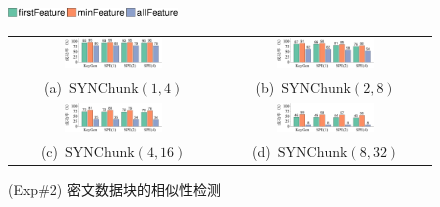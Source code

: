 \begin{figure}[!htb]
  \centering
  \includegraphics[width=0.4\textwidth]{pic/featurespy/plot/detection/syn/synBarPlotDetect_legend.pdf}\\
  \begin{tabular}{@{}c@{}c}
    \includegraphics[width=0.49\textwidth]{pic/featurespy/plot/detection/syn/syn-p1-q4-detect.pdf}  &
    \includegraphics[width=0.49\textwidth]{pic/featurespy/plot/detection/syn/syn-p2-q8-detect.pdf}    \\
    \mbox{\small (a) $\textrm{SYNChunk}(1, 4)$}                                                     &
    \mbox{\small (b) $\textrm{SYNChunk}(2, 8)$}                                                       \\
    \includegraphics[width=0.49\textwidth]{pic/featurespy/plot/detection/syn/syn-p4-q16-detect.pdf} &
    \includegraphics[width=0.49\textwidth]{pic/featurespy/plot/detection/syn/syn-p8-q32-detect.pdf}   \\
    \mbox{\small (c) $\textrm{SYNChunk}(4, 16)$}                                                    &
    \mbox{\small (d) $\textrm{SYNChunk}(8, 32)$}                                                      \\
  \end{tabular}
  \caption{(Exp\#2) 密文数据块的相似性检测}
  \label{fig:featurespy-expDetectionSynDetect}
\end{figure}

